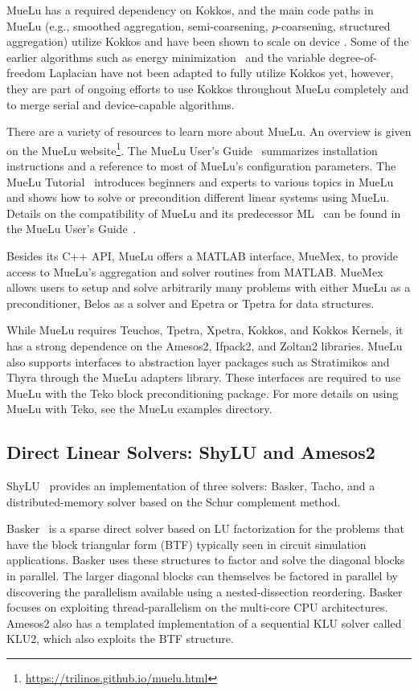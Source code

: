 MueLu has a required dependency on Kokkos,
and the main code paths in MueLu (e.g., smoothed aggregation, semi-coarsening, $p$-coarsening, structured aggregation)
utilize Kokkos and have been shown to scale on device \cite{BettencourtBrownEtAl2021_EmpirePic}.
Some of the earlier algorithms such as energy minimization~\cite{Sala2008a} and the variable degree-of-freedom Laplacian have not been adapted to fully utilize Kokkos yet,
however, they are part of ongoing efforts to use Kokkos throughout MueLu completely and to merge serial and device-capable algorithms.

There are a variety of resources to learn more about MueLu.
An overview is given on the MueLu website\footnote{\url{https://trilinos.github.io/muelu.html}}.
The MueLu User's Guide~\cite{BergerVergiat2023a} summarizes installation instructions and a reference to most of MueLu's configuration parameters.
The MueLu Tutorial~\cite{Mayr2023b} introduces beginners and experts to various topics in MueLu and shows how to solve or precondition different linear systems using MueLu.
Details on the compatibility of MueLu and its predecessor ML~\cite{Heroux2005a,Gee2006a} can be found in the MueLu User's Guide~\cite{BergerVergiat2023a}.

Besides its C++ API, MueLu offers a MATLAB interface, MueMex, to provide access to MueLu's aggregation and solver routines from MATLAB.
MueMex allows users to setup and solve arbitrarily many problems with either MueLu as a preconditioner, Belos as a solver and Epetra or Tpetra for data structures.

While MueLu requires Teuchos, Tpetra, Xpetra, Kokkos, and Kokkos Kernels, it has a strong dependence
on the Amesos2, Ifpack2, and Zoltan2 libraries.
MueLu also supports interfaces to abstraction layer packages such as Stratimikos and Thyra through the MueLu adapters library.
These interfaces are required to use MueLu with the Teko block preconditioning package.
For more details on using MueLu with Teko, see the MueLu examples directory.

\subsection{Direct Linear Solvers: ShyLU and Amesos2}

ShyLU~\cite{ShyLUCore2014} provides an implementation of three solvers: Basker, Tacho, and a distributed-memory solver based on the Schur complement method.

Basker~\cite{Basker2017} is a sparse direct solver based on LU factorization for the problems that have the block triangular form (BTF) typically seen in circuit simulation applications. Basker uses these structures to factor and solve the diagonal blocks in parallel. The larger diagonal blocks can themselves be factored in parallel by discovering the parallelism available using a nested-dissection reordering. Basker focuses on exploiting thread-parallelism on the multi-core CPU architectures. %
Amesos2 also has a templated implementation of a sequential KLU solver called KLU2, which also exploits the BTF structure.

